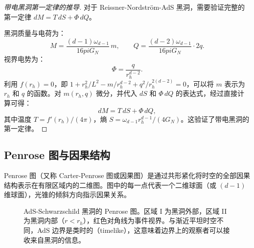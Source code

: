 \begin{proof}[带电黑洞第一定律的推导]
对于 Reissner-Nordstr\"om-AdS 黑洞，需要验证完整的第一定律 $dM = T\,dS + \Phi\,dQ$。

黑洞质量与电荷为：
\begin{equation}
    M = \frac{(d-1)\omega_{d-1}}{16pi G_N}\,m, \qquad Q = \frac{(d-2)\omega_{d-1}}{16pi G_N}\cdot 2q.
\end{equation}
视界电势为：
\begin{equation}
    \Phi = \frac{q}{r_h^{d-2}}.
\end{equation}
利用 $f(r_h) = 0$，即 $1 + r_h^2/L^2 - m/r_h^{d-2} + q^2/r_h^{2(d-2)} = 0$，可以将 $m$ 表示为 $r_h$ 和 $q$ 的函数。对 $m(r_h, q)$ 微分，并代入 $dS$ 和 $\Phi\,dQ$ 的表达式，经过直接计算可得：
\begin{equation}
    dM = T\,dS + \Phi\,dQ,
\end{equation}
其中温度 $T = f'(r_h)/(4\pi)$，熵 $S = \omega_{d-1}r_h^{d-1}/(4G_N)$。这验证了带电黑洞的第一定律。
\end{proof}

\subsection{Penrose 图与因果结构}

\begin{definition}[Penrose 图]\label{def:Penrose}
Penrose 图（又称 Carter-Penrose 图或因果图）是通过共形紧化将时空的全部因果结构表示在有限区域内的二维图。图中的每一点代表一个二维球面（或 $(d-1)$ 维球面），光锥的倾斜方向指示因果关系。
\end{definition}

\begin{figure}[htbp]
\centering
{}
\caption{AdS-Schwarzschild 黑洞的 Penrose 图。区域 I 为黑洞外部，区域 II 为黑洞内部（$r < r_h$），红色对角线为事件视界。与渐近平坦时空不同，AdS 边界是类时的（timelike），这意味着边界上的观察者可以接收来自黑洞的信息。}
\label{fig:Penrose-AdS}
\end{figure}

